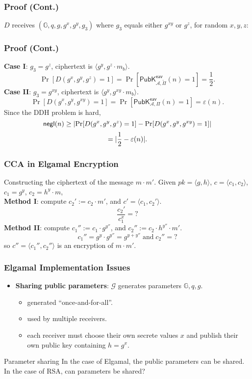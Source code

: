 \begin{frame}\frametitle{Proof (Cont.)}
$D$ receives $(\mathbb{G},q,g,g^x,g^y,g_3)$ where $g_3$ equals either $g^{xy}$ or $g^z$, for random $x, y, z$:
\begin{figure}
\begin{center}

\end{center}
\end{figure}
\end{frame}
\begin{frame}\frametitle{Proof (Cont.)}
\textbf{Case I}: $g_3 = g^z$, ciphertext is $\langle g^y, g^z\cdot m_b\rangle$.\\
\[ \Pr[D(g^x,g^y,g^z)=1] = \Pr\left[\mathsf{PubK}^{\mathsf{eav}}_{\mathcal{A},\tilde{\Pi}}(n)=1\right] = \frac{1}{2}.\]
\textbf{Case II}: $g_3 = g^{xy}$, ciphertext is $\langle g^y, g^{xy}\cdot m_b\rangle$.\\
\[ \Pr[D(g^x,g^y,g^{xy})=1] = \Pr\left[\mathsf{PubK}^{\mathsf{eav}}_{\mathcal{A},\Pi}(n)=1\right] = \varepsilon(n).\]
Since the DDH problem is hard,
\[  \mathsf{negl}(n) \ge \lvert\Pr[D(g^x,g^y,g^z)=1] - \Pr[D(g^x,g^y,g^{xy})=1]\rvert\]
\[ =\lvert\frac{1}{2}-\varepsilon(n)\rvert. \]
\end{frame}
\begin{frame}\frametitle{CCA in Elgamal Encryption}
\begin{exampleblock}{Constructing the ciphertext of the message $m\cdot m'$.}
Given $pk=\langle g, h\rangle$, $c = \langle c_1, c_2\rangle$, $c_1=g^y$, $c_2=h^y\cdot m$, \\ \textbf{Method I}: compute
$c_2' := c_2\cdot m'$, and $c' = \langle c_1, c_2'\rangle$.
\[\frac{c_2'}{c_1^x} = ? \]%
\textbf{Method II}: compute $c_1'' := c_1\cdot g^{y''}$, and $c_2'' := c_2\cdot h^{y''}\cdot m'$.
\[c_1''=g^y\cdot g^{y''} = g^{y+y''}\;\text{and}\; c_2''= ? \] %
so $c''=\langle c_1'',c_2''\rangle$ is an encryption of $m\cdot m'$.
\end{exampleblock}
\end{frame}
\begin{frame}\frametitle{Elgamal Implementation Issues}
\begin{itemize}
\item \textbf{Sharing public parameters}: $\mathcal{G}$ generates parameters $\mathbb{G},q,g$.
\begin{itemize}
\item generated ``once-and-for-all''.
\item used by multiple receivers.
\item each receiver must choose their own secrete values $x$ and publish their own public key containing $h=g^x$.
\end{itemize}
\end{itemize}
\begin{alertblock}{Parameter sharing}
In the case of Elgamal, the public parameters can be shared. In the case of RSA, can parameters be shared?
\end{alertblock}
\end{frame}

